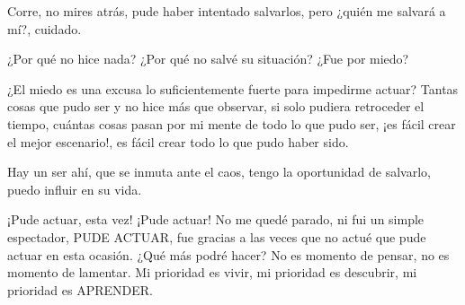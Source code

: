 Corre, no mires atrás, pude haber intentado salvarlos, pero ¿quién me salvará a mí?, cuidado.

¿Por qué no hice nada? ¿Por qué no salvé su situación?
¿Fue por miedo?

¿El miedo es una excusa lo suficientemente fuerte para impedirme actuar?
Tantas cosas que pudo ser y no hice más que observar, si solo pudiera retroceder el tiempo, cuántas cosas pasan por mi mente de todo lo que pudo ser, ¡es fácil crear el mejor escenario!, es fácil crear todo lo que pudo haber sido.

Hay un ser ahí, que se inmuta ante el caos, tengo la oportunidad de salvarlo, puedo influir en su vida.

¡Pude actuar, esta vez! ¡Pude actuar! No me quedé parado, ni fui un simple espectador, PUDE ACTUAR, fue gracias a las veces que no actué que pude actuar en esta ocasión. ¿Qué más podré hacer? No es momento de pensar, no es momento de lamentar. Mi prioridad es vivir, mi prioridad es descubrir, mi prioridad es APRENDER.
